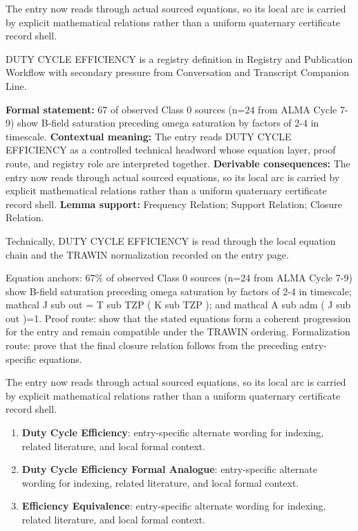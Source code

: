 The entry now reads through actual sourced equations, so its local arc is carried by explicit mathematical relations rather than a uniform quaternary certificate record shell.
\clearpage


\begingroup\small
{}
DUTY CYCLE EFFICIENCY is a registry definition in Registry and Publication Workflow with secondary pressure from Conversation and Transcript Companion Line.

\begingroup\footnotesize\setlength{\emergencystretch}{3em}\sloppy
\textbf{Formal statement:} 67 of observed Class 0 sources (n=24 from ALMA Cycle 7-9) show B-field saturation preceding omega saturation by factors of 2-4 in timescale. \textbf{Contextual meaning:} The entry reads DUTY CYCLE EFFICIENCY as a controlled technical headword whose equation layer, proof route, and registry role are interpreted together. \textbf{Derivable consequences:} The entry now reads through actual sourced equations, so its local arc is carried by explicit mathematical relations rather than a uniform quaternary certificate record shell. \textbf{Lemma support:} Frequency Relation; Support Relation; Closure Relation.\par
\endgroup

Technically, DUTY CYCLE EFFICIENCY is read through the local equation chain and the TRAWIN normalization recorded on the entry page.

Equation anchors: 67\% of observed Class 0 sources (n=24 from ALMA Cycle 7-9) show B-field saturation preceding omega saturation by factors of 2-4 in timescale; mathcal J sub out = T sub TZP ( K sub TZP ); and mathcal A sub adm ( J sub out )=1. Proof route: show that the stated equations form a coherent progression for the entry and remain compatible under the TRAWIN ordering. Formalization route: prove that the final closure relation follows from the preceding entry-specific equations.

The entry now reads through actual sourced equations, so its local arc is carried by explicit mathematical relations rather than a uniform quaternary certificate record shell.
\endgroup

\begin{enumerate}[leftmargin=1.6em,itemsep=6pt,topsep=4pt]
\item \textbf{Duty Cycle Efficiency}: entry-specific alternate wording for indexing, related literature, and local formal context.
\item \textbf{Duty Cycle Efficiency Formal Analogue}: entry-specific alternate wording for indexing, related literature, and local formal context.
\item \textbf{Efficiency Equivalence}: entry-specific alternate wording for indexing, related literature, and local formal context.
\end{enumerate}

